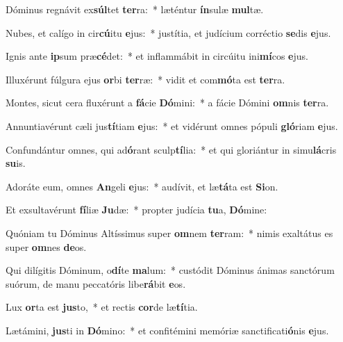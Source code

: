 \item Dóminus regnávit ex\textbf{súl}tet \textbf{ter}ra:~* læténtur \textbf{ín}sulæ \textbf{mul}tæ.
\item Nubes, et calígo in cir\textbf{cú}itu \textbf{e}jus:~* justítia, et judícium corréctio \textbf{se}dis \textbf{e}jus.
\item Ignis ante \textbf{ip}sum præ\textbf{cé}det:~* et inflammábit in circúitu ini\textbf{mí}cos \textbf{e}jus.
\item Illuxérunt fúlgura ejus \textbf{or}bi \textbf{ter}ræ:~* vidit et com\textbf{mó}ta est \textbf{ter}ra.
\item Montes, sicut cera fluxérunt a \textbf{fá}cie \textbf{Dó}mini:~* a fácie Dómini \textbf{om}nis \textbf{ter}ra.
\item Annuntiavérunt cæli jus\textbf{tí}tiam \textbf{e}jus:~* et vidérunt omnes pópuli \textbf{gló}riam \textbf{e}jus.
\item Confundántur omnes, qui ad\textbf{ó}rant sculp\textbf{tí}lia:~* et qui gloriántur in simu\textbf{lá}cris \textbf{su}is.
\item Adoráte eum, omnes \textbf{An}geli \textbf{e}jus:~* audívit, et læ\textbf{tá}ta est \textbf{Si}on.
\item Et exsultavérunt \textbf{fí}liæ \textbf{Ju}dæ:~* propter judícia \textbf{tu}a, \textbf{Dó}mine:
\item Quóniam tu Dóminus Altíssimus super \textbf{om}nem \textbf{ter}ram:~* nimis exaltátus es super \textbf{om}nes \textbf{de}os.
\item Qui dilígitis Dóminum, o\textbf{dí}te \textbf{ma}lum:~* custódit Dóminus ánimas sanctórum suórum, de manu peccatóris libe\textbf{rá}bit \textbf{e}os.
\item Lux \textbf{or}ta est \textbf{jus}to,~* et rectis \textbf{cor}de læ\textbf{tí}tia.
\item Lætámini, \textbf{jus}ti in \textbf{Dó}mino:~* et confitémini memóriæ sanctificati\textbf{ó}nis \textbf{e}jus.
